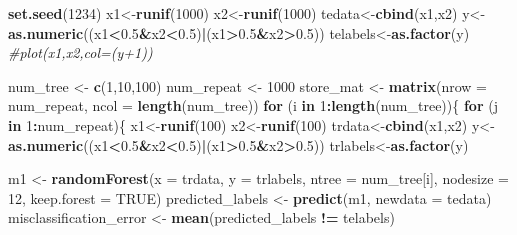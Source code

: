\documentclass[
]{article}
\newenvironment{Shaded}{\begin{snugshade}}{\end{snugshade}}
\newcommand{\AttributeTok}[1]{\textcolor[rgb]{0.13,0.29,0.53}{#1}}
\newcommand{\CommentTok}[1]{\textcolor[rgb]{0.56,0.35,0.01}{\textit{#1}}}
\newcommand{\ConstantTok}[1]{\textcolor[rgb]{0.56,0.35,0.01}{#1}}
\newcommand{\ControlFlowTok}[1]{\textcolor[rgb]{0.13,0.29,0.53}{\textbf{#1}}}
\newcommand{\DecValTok}[1]{\textcolor[rgb]{0.00,0.00,0.81}{#1}}
\newcommand{\FloatTok}[1]{\textcolor[rgb]{0.00,0.00,0.81}{#1}}
\newcommand{\FunctionTok}[1]{\textcolor[rgb]{0.13,0.29,0.53}{\textbf{#1}}}
\newcommand{\NormalTok}[1]{#1}
\newcommand{\OtherTok}[1]{\textcolor[rgb]{0.56,0.35,0.01}{#1}}
\newcommand{\SpecialCharTok}[1]{\textcolor[rgb]{0.81,0.36,0.00}{\textbf{#1}}}
\begin{document}
\begin{Shaded}
\begin{Highlighting}[]
\FunctionTok{set.seed}\NormalTok{(}\DecValTok{1234}\NormalTok{)}
\NormalTok{x1}\OtherTok{\textless{}{-}}\FunctionTok{runif}\NormalTok{(}\DecValTok{1000}\NormalTok{)}
\NormalTok{x2}\OtherTok{\textless{}{-}}\FunctionTok{runif}\NormalTok{(}\DecValTok{1000}\NormalTok{)}
\NormalTok{tedata}\OtherTok{\textless{}{-}}\FunctionTok{cbind}\NormalTok{(x1,x2)}
\NormalTok{y}\OtherTok{\textless{}{-}}\FunctionTok{as.numeric}\NormalTok{((x1}\SpecialCharTok{\textless{}}\FloatTok{0.5}\SpecialCharTok{\&}\NormalTok{x2}\SpecialCharTok{\textless{}}\FloatTok{0.5}\NormalTok{)}\SpecialCharTok{|}\NormalTok{(x1}\SpecialCharTok{\textgreater{}}\FloatTok{0.5}\SpecialCharTok{\&}\NormalTok{x2}\SpecialCharTok{\textgreater{}}\FloatTok{0.5}\NormalTok{))}
\NormalTok{telabels}\OtherTok{\textless{}{-}}\FunctionTok{as.factor}\NormalTok{(y)}
\CommentTok{\#plot(x1,x2,col=(y+1))}

\NormalTok{num\_tree }\OtherTok{\textless{}{-}} \FunctionTok{c}\NormalTok{(}\DecValTok{1}\NormalTok{,}\DecValTok{10}\NormalTok{,}\DecValTok{100}\NormalTok{)}
\NormalTok{num\_repeat }\OtherTok{\textless{}{-}} \DecValTok{1000}
\NormalTok{store\_mat }\OtherTok{\textless{}{-}} \FunctionTok{matrix}\NormalTok{(}\AttributeTok{nrow =}\NormalTok{ num\_repeat, }\AttributeTok{ncol =} \FunctionTok{length}\NormalTok{(num\_tree))}
\ControlFlowTok{for}\NormalTok{ (i }\ControlFlowTok{in} \DecValTok{1}\SpecialCharTok{:}\FunctionTok{length}\NormalTok{(num\_tree))\{}
  \ControlFlowTok{for}\NormalTok{ (j }\ControlFlowTok{in} \DecValTok{1}\SpecialCharTok{:}\NormalTok{num\_repeat)\{}
\NormalTok{    x1}\OtherTok{\textless{}{-}}\FunctionTok{runif}\NormalTok{(}\DecValTok{100}\NormalTok{)}
\NormalTok{    x2}\OtherTok{\textless{}{-}}\FunctionTok{runif}\NormalTok{(}\DecValTok{100}\NormalTok{)}
\NormalTok{    trdata}\OtherTok{\textless{}{-}}\FunctionTok{cbind}\NormalTok{(x1,x2)}
\NormalTok{    y}\OtherTok{\textless{}{-}}\FunctionTok{as.numeric}\NormalTok{((x1}\SpecialCharTok{\textless{}}\FloatTok{0.5}\SpecialCharTok{\&}\NormalTok{x2}\SpecialCharTok{\textless{}}\FloatTok{0.5}\NormalTok{)}\SpecialCharTok{|}\NormalTok{(x1}\SpecialCharTok{\textgreater{}}\FloatTok{0.5}\SpecialCharTok{\&}\NormalTok{x2}\SpecialCharTok{\textgreater{}}\FloatTok{0.5}\NormalTok{))}
\NormalTok{    trlabels}\OtherTok{\textless{}{-}}\FunctionTok{as.factor}\NormalTok{(y)}
    
\NormalTok{    m1 }\OtherTok{\textless{}{-}} \FunctionTok{randomForest}\NormalTok{(}\AttributeTok{x =}\NormalTok{ trdata, }\AttributeTok{y =}\NormalTok{ trlabels, }\AttributeTok{ntree =}\NormalTok{ num\_tree[i], }\AttributeTok{nodesize =} \DecValTok{12}\NormalTok{, }\AttributeTok{keep.forest =} \ConstantTok{TRUE}\NormalTok{)}
\NormalTok{    predicted\_labels }\OtherTok{\textless{}{-}} \FunctionTok{predict}\NormalTok{(m1, }\AttributeTok{newdata =}\NormalTok{ tedata)}
\NormalTok{    misclassification\_error }\OtherTok{\textless{}{-}} \FunctionTok{mean}\NormalTok{(predicted\_labels }\SpecialCharTok{!=}\NormalTok{ telabels)}
    

\end{Highlighting}
\end{Shaded}
\end{document}
